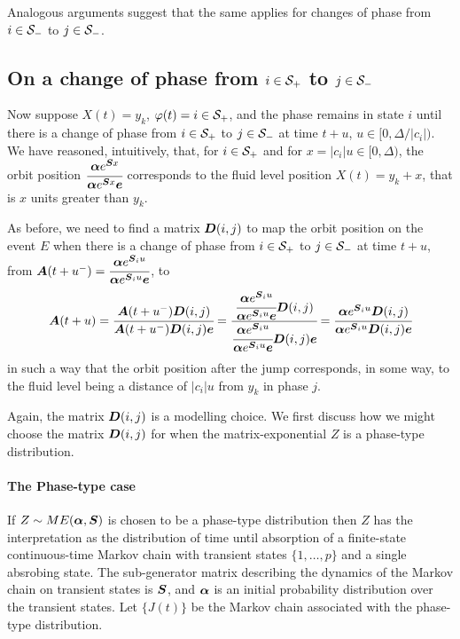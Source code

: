 Analogous arguments suggest that the same applies for changes of phase from \(i\in\mathcal{S}_-\) to \(j\in\mathcal{S}_-\). 

\subsection{On a change of phase from \(i\in\mathcal{S}_+\) to \(j\in\mathcal{S}_-\)} 
Now suppose \(X(t)=y_k\), \(\varphi(t)=i\in\mathcal{S}_+\), and the phase remains in state \(i\) until there is a change of phase from \(i\in\mathcal{S}_+\) to \(j\in\mathcal{S}_-\) at time \(t+u\), \(u\in[0,\Delta/|c_i|)\). We have reasoned, intuitively, that, for \(i\in\mathcal{S}_+\) and for \(x=|c_i|u\in[0,\Delta)\), the orbit position \(\cfrac{\boldsymbol\alpha e^{\boldsymbol Sx} }{\boldsymbol\alpha e^{\boldsymbol Sx } \boldsymbol e}\) corresponds to the fluid level position \(X(t) = y_k+x\), that is \(x\) units greater than \(y_k\).  

As before, we need to find a matrix \(\boldsymbol D(i,j)\) to map the orbit position on the event \(E\) when there is a change of phase from \(i\in\mathcal{S}_+\) to \(j\in\mathcal{S}_-\) at time \(t+u\), from \(\boldsymbol A(t+u^-) = \cfrac{\boldsymbol\alpha e^{\boldsymbol S_iu} }{\boldsymbol\alpha e^{\boldsymbol S_iu } \boldsymbol e}\), to 
\[\boldsymbol A(t+u) = \cfrac{\boldsymbol A(t+u^-)\boldsymbol D(i,j)}{\boldsymbol A(t+u^-)\boldsymbol D(i,j)\boldsymbol e}=\cfrac{\cfrac{\boldsymbol\alpha e^{\boldsymbol S_iu} }{\boldsymbol\alpha e^{\boldsymbol S_iu } \boldsymbol e}\boldsymbol D(i,j)}{\cfrac{\boldsymbol\alpha e^{\boldsymbol S_iu} }{\boldsymbol\alpha e^{\boldsymbol S_iu } \boldsymbol e}\boldsymbol D(i,j)\boldsymbol e}=\cfrac{\boldsymbol\alpha e^{\boldsymbol S_iu} \boldsymbol D(i,j)}{\boldsymbol\alpha e^{\boldsymbol S_iu}\boldsymbol D(i,j)\boldsymbol e}\]
in such a way that the orbit position after the jump corresponds, in some way, to the fluid level being a distance of \(|c_i|u\) from \(y_k\) in phase \(j\). 

Again, the matrix \(\boldsymbol D(i,j)\) is a modelling choice. We first discuss how we might choose the matrix \(\boldsymbol D(i,j)\) for when the matrix-exponential \(Z\) is a phase-type distribution. 

\paragraph{The Phase-type case}
If \(Z\sim ME(\boldsymbol \alpha, \boldsymbol S)\) is chosen to be a phase-type distribution then \(Z\) has the interpretation as the distribution of time until absorption of a finite-state continuous-time Markov chain with transient states \(\{1,\dots,p\}\) and a single absrobing state. The sub-generator matrix describing the dynamics of the Markov chain on transient states is \(\boldsymbol S\), and \(\boldsymbol \alpha\) is an initial probability distribution over the transient states. Let \(\{J(t)\}\) be the Markov chain associated with the phase-type distribution. 

